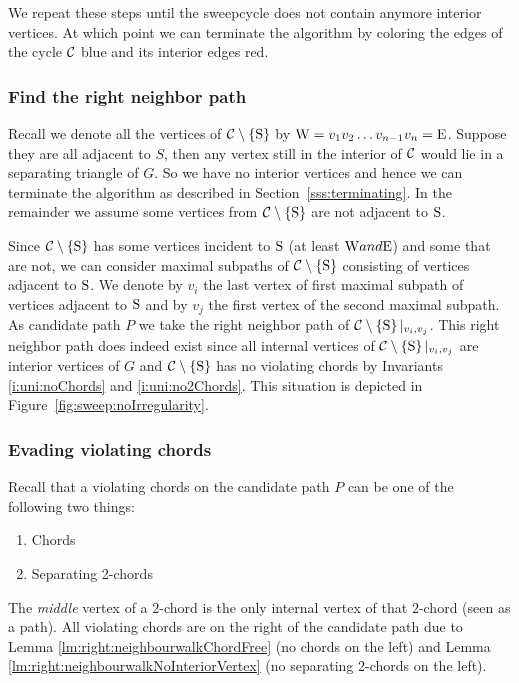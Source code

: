 We repeat these steps until the sweepcycle does not contain anymore interior vertices. At which point we can terminate the algorithm by coloring the edges of the cycle $\mathcal{C}$ blue and its interior edges red.

\subsubsection{Find the right neighbor path}
  Recall we denote all the vertices of $\mathcal{C} \setminus \left\lbrace {\mathrm{S}} \right\rbrace$ by $\mathrm{W} =  v_1   v_2   \ldots v_{n-1}   v_n = \mathrm{E}$.
  Suppose they are all adjacent to $S$, then any vertex still in the interior of $\mathcal{C}$ would lie in a separating triangle of $G$. So we have no interior vertices and hence we can terminate the algorithm as described in Section~\ref{sss:terminating}.
  In the remainder we assume some vertices from $\mathcal{C} \setminus \left\lbrace {\mathrm{S}} \right\rbrace$ are not adjacent to $\mathrm{S}$.

  Since $\mathcal{C} \setminus \left\lbrace {\mathrm{S}} \right\rbrace$ has some vertices incident to $\mathrm{S}$ (at least $\mathrm{W} and \mathrm{E}$) and some that are not, we can consider maximal subpaths of $\mathcal{C} \setminus \left\lbrace {\mathrm{S}} \right\rbrace$ consisting of vertices adjacent to $\mathrm{S}$.
  We denote by $v_i$ the last vertex of first maximal subpath of vertices adjacent to $\mathrm{S}$ and by $v_j$ the first vertex of the second maximal subpath.
  As candidate path $P$ we take the right neighbor path of $\mathcal{C} \setminus \left\lbrace {\mathrm{S}} \right\rbrace|_{v_i, v_j}$. This right neighbor path does indeed exist since all internal vertices of $\mathcal{C} \setminus \left\lbrace {\mathrm{S}} \right\rbrace|_{v_i, v_j}$ are interior vertices of $G$ and $\mathcal{C} \setminus \left\lbrace {\mathrm{S}} \right\rbrace$ has no violating chords by Invariants \ref{i:uni:noChords} and \ref{i:uni:no2Chords}.
  This situation is depicted in Figure~\ref{fig:sweep:noIrregularity}.

\subsubsection{Evading violating chords}
  Recall that a violating chords on the candidate path $P$ can be one of the following two things:
  \begin{enumerate}
    \itemsep=-4pt
    \item Chords
    \item Separating 2-chords
  \end{enumerate}

  The \emph{middle} vertex of a $2$-chord is the only internal vertex of that $2$-chord (seen as a path).
  All violating chords are on the right of the candidate path due to Lemma \ref{lm:right:neighbourwalkChordFree} (no chords on the left) and Lemma \ref{lm:right:neighbourwalkNoInteriorVertex} (no separating 2-chords on the left).

